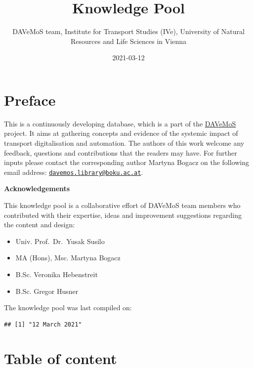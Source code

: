 \documentclass[
]{book}
\title{Knowledge Pool}
\author{DAVeMoS team, Institute for Transport Studies (IVe), University of Natural Resources and Life Sciences in Vienna}
\date{2021-03-12}
\providecommand{\tightlist}{%
  \setlength{\itemsep}{0pt}\setlength{\parskip}{0pt}}
\begin{document}
\maketitle

{
\setcounter{tocdepth}{1}
\tableofcontents
}
\hypertarget{preface}{%
\chapter*{Preface}\label{preface}}

This is a continuously developing database, which is a part of the \href{https://www.davemos.online/}{DAVeMoS} project. It aims at gathering concepts and evidence of the systemic impact of transport digitalisation and automation. The authors of this work welcome any feedback, questions and contributions that the readers may have. For further inputs please contact the corresponding author Martyna Bogacz on the following email address: \href{mailto:davemos.library@boku.ac.at}{\nolinkurl{davemos.library@boku.ac.at}}.

\textbf{Acknowledgements}

This knowledge pool is a collaborative effort of DAVeMoS team members who contributed with their expertise, ideas and improvement suggestions regarding the content and design:

\begin{itemize}
\tightlist
\item
  Univ. Prof.~Dr.~Yusak Susilo
\item
  MA (Hons), Msc. Martyna Bogacz
\item
  B.Sc. Veronika Hebenstreit
\item
  B.Sc. Gregor Husner
\end{itemize}

The knowledge pool was last compiled on:

\begin{verbatim}
## [1] "12 March 2021"
\end{verbatim}

\hypertarget{table-of-content}{%
\chapter*{Table of content}\label{table-of-content}}
\end{document}
